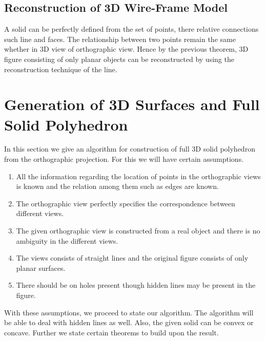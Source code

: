 \documentclass[12pt]{article}
\begin{document}
\subsection{Reconstruction of 3D Wire-Frame Model}

	A solid can be perfectly defined from the set of points, there relative connections such line and faces. The relationship between two points remain the same whether in 3D view of orthographic view. Hence by the previous theorem, 3D figure consisting of only planar objects can be reconstructed by using the reconstruction technique of the line.

\section{Generation of 3D Surfaces and Full Solid Polyhedron}

    In this section we give an algorithm for construction of full 3D solid polyhedron from the orthographic projection. For this we will have certain assumptions.
    
    \begin{enumerate}
        \item All the information regarding the location of points in the orthographic views is known and the relation among them such as edges are known.
        \item The orthographic view perfectly specifies the correspondence between different views.
        \item The given orthographic view is constructed from a real object and there is no ambiguity in the different views. 
        \item The views consists of straight lines and the original figure consists of only planar surfaces.
        \item There should be on holes present though hidden lines may be present in the figure.
    \end{enumerate}
    
    With these assumptions, we proceed to state our algorithm. The algorithm will be able to deal with hidden lines as well. Also, the given solid can be convex or concave. Further we state certain theorems to build upon the result.
    
\end{document}
